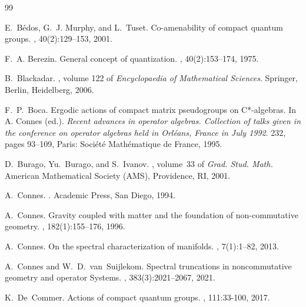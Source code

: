 \documentclass{amsart}
\theoremstyle{plain}
\theoremstyle{definition}
\theoremstyle{remark}
\begin{document}
	
	\begin{thebibliography}{99}
		
		E.~B{\'e}dos, G.~J. Murphy, and L.~Tuset.
		\newblock Co-amenability of compact quantum groups.
		, 40(2):129--153, 2001.
		
		F.~A. Berezin.
		\newblock General concept of quantization.
		, 40(2):153--174, 1975.
		
		B.~Blackadar.
		, volume 122 of {\em Encyclopaedia of {{Mathematical Sciences}}}.
		\newblock Springer, Berlin, Heidelberg, 2006.
		
		F.~P.~Boca.
		\newblock Ergodic actions of compact matrix pseudogroups on {{C}}*-algebras.
		\newblock In A. Connes (ed.). {\em Recent advances in operator algebras. Collection of talks given in the conference on operator algebras held in Orléans, France in July 1992}.
		 232, pages 93--109, Paris: Soci{\'e}t{\'e} Math{\'e}matique de France, 1995.
		
		D.~Burago, {\relax Yu}.~Burago, and S.~Ivanov.
		, volume~33 of {\em Grad. {{Stud}}.
			{{Math}}.}
		\newblock American Mathematical Society (AMS), Providence, RI, 2001.
		
		A.~Connes.
		.
		\newblock Academic Press, San Diego, 1994.
		
		A.~Connes.
		\newblock Gravity coupled with matter and the foundation of non-commutative
		geometry.
		, 182(1):155--176, 1996.
		
		A.~Connes.
		\newblock On the spectral characterization of manifolds.
		, 7(1):1--82, 2013.
		
		A.~Connes and W.~D.~van~Suijlekom.
		\newblock Spectral truncations in noncommutative geometry and
		operator Systems.
		, 383(3):2021--2067, 2021.
		
		K.~De~Commer.
		\newblock Actions of compact quantum groups.
		, 
		111:33-100, 2017.
		

\end{thebibliography}
\end{document}
